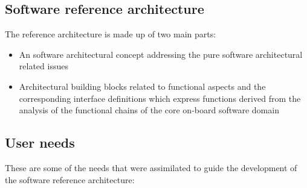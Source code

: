 \subsection{Software reference architecture}
The reference architecture is made up of two main parts:

\begin{itemize}
\item An software architectural concept addressing the pure software architectural related issues
\item Architectural building blocks related to functional aspects and the corresponding interface definitions which express functions derived from the analysis of the functional chains of the core on-board software domain 
\end{itemize}

\subsection{User needs}
These are some of the needs that were assimilated to guide the development of the software reference architecture:

